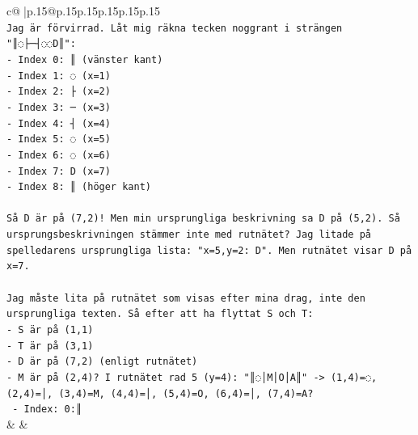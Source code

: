 \documentclass{article}
\begin{document}
{\begin{supertabular}{c@{$\;$}|p{.15\linewidth}@{}p{.15\linewidth}p{.15\linewidth}p{.15\linewidth}p{.15\linewidth}p{.15\linewidth}}
{{{\\ 
\texttt{Jag är förvirrad. Låt mig räkna tecken noggrant i strängen "║◌├─┤◌◌D║":} \\
\texttt{{-} Index 0: ║ (vänster kant)} \\
\texttt{{-} Index 1: ◌ (x=1)} \\
\texttt{{-} Index 2: ├ (x=2)} \\
\texttt{{-} Index 3: ─ (x=3)} \\
\texttt{{-} Index 4: ┤ (x=4)} \\
\texttt{{-} Index 5: ◌ (x=5)} \\
\texttt{{-} Index 6: ◌ (x=6)} \\
\texttt{{-} Index 7: D (x=7)} \\
\texttt{{-} Index 8: ║ (höger kant)} \\
\\ 
\texttt{Så D är på (7,2)! Men min ursprungliga beskrivning sa D på (5,2). Så ursprungsbeskrivningen stämmer inte med rutnätet? Jag litade på spelledarens ursprungliga lista: "x=5,y=2: D". Men rutnätet visar D på x=7.} \\
\\ 
\texttt{Jag måste lita på rutnätet som visas efter mina drag, inte den ursprungliga texten. Så efter att ha flyttat S och T:} \\
\texttt{{-} S är på (1,1)} \\
\texttt{{-} T är på (3,1)} \\
\texttt{{-} D är på (7,2) (enligt rutnätet)} \\
\texttt{{-} M är på (2,4)? I rutnätet rad 5 (y=4): "║◌│M│O│A║" {-}> (1,4)=◌, (2,4)=│, (3,4)=M, (4,4)=│, (5,4)=O, (6,4)=│, (7,4)=A? } \\
\texttt{  {-} Index: 0:║} \\
            }
        }
    }
    & & \\ \\


\end{supertabular}}
\end{document}
